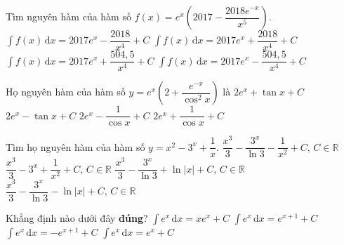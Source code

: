 \begin{ex}%
Tìm nguyên hàm của hàm số $f(x)=e^x\left(2017-\dfrac{2018e^{-x}}{x^5}\right) $.
\choice
{$\displaystyle\int f(x) \mathrm{\,d}x=2017e^x-\dfrac{2018}{x^4}+C$}
{$\displaystyle\int f(x) \mathrm{\,d}x=2017e^x+\dfrac{2018}{x^4}+C$}
{\True $\displaystyle\int f(x) \mathrm{\,d}x=2017e^x+\dfrac{504{,}5}{x^4}+C$}
{$\displaystyle\int f(x) \mathrm{\,d}x=2017e^x-\dfrac{504{,}5}{x^4}+C$}
\end{ex}

\begin{ex}%
Họ nguyên hàm của hàm số $y=e^x\left(2+\dfrac{e^{-x}}{\cos^2x}\right) $ là
\choice
{\True $2e^x+\tan x+C$}
{$2e^x-\tan x+C$}
{$2e^x-\dfrac{1}{\cos x}+C$}
{$2e^x+\dfrac{1}{\cos x}+C$}
\end{ex}

\begin{ex}%
Tìm họ nguyên hàm của hàm số $y=x^2-3^x+\dfrac{1}{x}$.
\choice
{$\dfrac{x^3}{3}-\dfrac{3^x}{\ln 3}-\dfrac{1}{x^2}+C,\,C\in \mathbb{R}$}
{$\dfrac{x^3}{3}-3^x+\dfrac{1}{x^2}+C,\,C\in \mathbb{R}$}
{\True $\dfrac{x^3}{3}-\dfrac{3^x}{\ln 3}+\ln \left|x\right|+C,\,C\in \mathbb{R}$}
{$\dfrac{x^3}{3}-\dfrac{3^x}{\ln 3}-\ln \left|x\right|+C,\,C\in \mathbb{R}$}
\end{ex}

\begin{ex}%
Khẳng định nào dưới đây \textbf{đúng}?
\choice
{$\displaystyle\int e^x \mathrm{\,d}x=xe^x+C$}
{$\displaystyle\int e^x \mathrm{\,d}x=e^{x+1}+C$}
{$\displaystyle\int e^x \mathrm{\,d}x=-e^{x+1}+C$}
{\True $\displaystyle\int e^x \mathrm{\,d}x=e^x+C$}
\end{ex}

